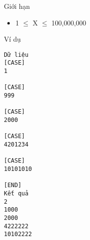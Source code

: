 Giới hạn  
\begin{itemize}
	\item     1  $\le$  X  $\le$  100,000,000   
\end{itemize}
   Ví dụ  
\begin{verbatim}
Dữ liệu
[CASE]
1

[CASE]
999

[CASE]
2000

[CASE]
4201234

[CASE]
10101010

[END]
Kết quả
2
1000
2000
4222222
10102222
\end{verbatim}